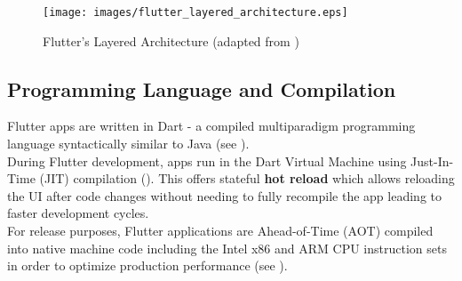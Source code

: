 \begin{figure}
    \centering
    \texttt{[image: images/flutter\_layered\_architecture.eps]}
    \caption{Flutter's Layered Architecture (adapted from \cite{FlutterArchitecture2021})}
    \label{fig:flutter_layered_architecture}
\end{figure}


\subsection{Programming Language and Compilation}
Flutter apps are written in Dart - a compiled multiparadigm programming language syntactically similar to Java (see \cite{DartLanguage2021}).\\
During Flutter development, apps run in the Dart Virtual Machine using Just-In-Time (JIT) compilation (\cite{DartLanguage2021}). 
This offers stateful \textbf{hot reload} which allows reloading the UI after code changes without needing to fully recompile the app leading to faster development cycles.\\
For release purposes, Flutter applications are Ahead-of-Time (AOT) compiled into native machine code including the Intel x86 and ARM CPU instruction sets in order to optimize production performance
(see \cite{FlutterArchitecture2021}).


